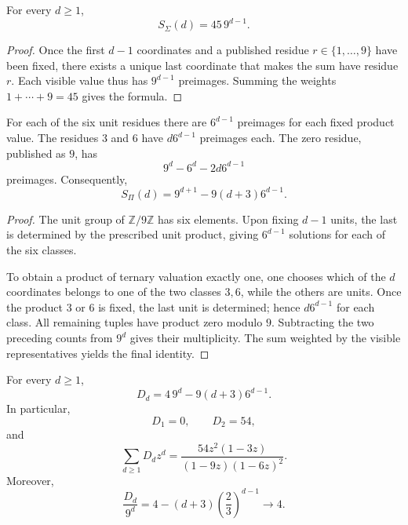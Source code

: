 \begin{lemma}
\label{p12-83-c1-s5:lem:masa-hoja-aditiva-longitud}
For every \(d\geq1\),
\[
 S_\Sigma(d)=45\,9^{d-1}.
\]
\end{lemma}

\begin{proof}
Once the first \(d-1\) coordinates and a published residue
\(r\in\{1,\ldots,9\}\) have been fixed, there exists a unique last coordinate that makes the
sum have residue \(r\). Each visible value thus has \(9^{d-1}\)
preimages. Summing the weights \(1+\cdots+9=45\) gives the formula.
\end{proof}

\begin{lemma}
\label{p12-83-c1-s5:lem:censo-hoja-multiplicativa-longitud}
For each of the six unit residues there are \(6^{d-1}\) preimages for each
fixed product value. The residues \(3\) and \(6\) have
\(d6^{d-1}\) preimages each. The zero residue, published as
\(9\), has
\[
 9^d-6^d-2d6^{d-1}
\]
preimages. Consequently,
\[
 S_\Pi(d)=9^{d+1}-9(d+3)6^{d-1}.
\]
\end{lemma}

\begin{proof}
The unit group of \(\mathbb Z/9\mathbb Z\) has six elements. Upon
fixing \(d-1\) units, the last is determined by the prescribed
unit product, giving \(6^{d-1}\) solutions for each of the
six classes.

To obtain a product of ternary valuation exactly one, one chooses which
of the \(d\) coordinates belongs to one of the two classes \(3,6\), while
the others are units. Once the product \(3\) or \(6\) is fixed, the last unit
is determined; hence \(d6^{d-1}\) for each class. All remaining tuples
have product zero modulo \(9\). Subtracting the two preceding
counts from \(9^d\) gives their multiplicity. The sum weighted by the
visible representatives yields the final identity.
\end{proof}

\begin{theorem}
\label{p12-83-c1-s5:thm:ley-dimensional-app-autonoma}
For every \(d\geq1\),
\[
 \boxed{D_d=4\,9^d-9(d+3)6^{d-1}.}
\]
In particular,
\[
 D_1=0,
 \qquad
 D_2=54,
\]
and
\[
 \sum_{d\geq1}D_dz^d
 =\frac{54z^2(1-3z)}{(1-9z)(1-6z)^2}.
\]
Moreover,
\[
 \frac{D_d}{9^d}
 =4-(d+3)\left(\frac23\right)^{d-1}
 \longrightarrow4.
\]
\end{theorem}


